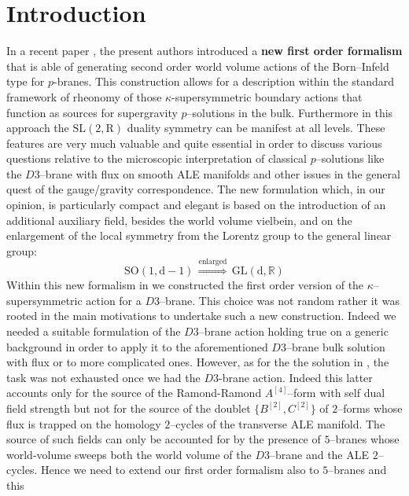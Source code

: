 \documentclass[a4paper,11pt]{article}
\begin{document}
\section{Introduction}
In a recent paper \cite{noidued3}, the present authors introduced
a \textbf{new first order formalism} that is able of generating second order world volume actions of
the Born--Infeld type for $p$-branes.
This construction allows for a description within the
standard framework of rheonomy of those $\kappa$-supersymmetric boundary actions
that function as sources for  supergravity $p$--solutions in the bulk. Furthermore
in this approach the $\mathrm{SL(2,\mathrm{R})}$
duality symmetry  can be manifest at all levels.
These features are very much valuable and quite essential in order
to discuss various questions relative to the microscopic
interpretation of classical $p$--solutions like the $D3$--brane with flux on
smooth ALE manifolds \cite{noialtrilast} and other issues in the
general quest of the gauge/gravity correspondence.
The new formulation which, in our opinion, is
particularly compact and elegant is based on the introduction of an
additional auxiliary field, besides the world volume vielbein, and on
the enlargement of the local symmetry from the Lorentz group to the
general linear group:
\begin{equation}
  \mathrm{SO(1,d-1)}\,  \stackrel{\mbox{enlarged}}{\Longrightarrow}
  \, \mathrm{GL(d,\mathbb{R})}
\label{allargo}
\end{equation}
Within this new formalism in \cite{noidued3} we constructed the first order
version of the $\kappa$--supersymmetric action for
a $D3$--brane. This choice was not random rather it was rooted in the main
motivations to undertake such a  new construction. Indeed we needed a
suitable formulation of the $D3$--brane action holding true on a
generic background in order to apply it to the aforementioned
$D3$--brane bulk solution with flux \cite{noialtrilast} or to more complicated ones.
However, as for the the solution in \cite{noialtrilast}, the task was not
exhausted once we had the $D3$-brane action. Indeed this latter accounts
only  for the source of the  Ramond-Ramond $A^{[4]}$--form with self dual field
strength but not for the source of the doublet $\{ B^{[2]} , C^{[2]} \}$
of $2$--forms whose flux is trapped on the homology $2$--cycles of
the transverse ALE manifold. The source of such fields can only be accounted for
by the presence of $5$--branes whose world-volume sweeps both the
world volume of the $D3$--brane and the ALE $2$--cycles. Hence we
need to extend our first order formalism also to $5$--branes and this
\end{document}
